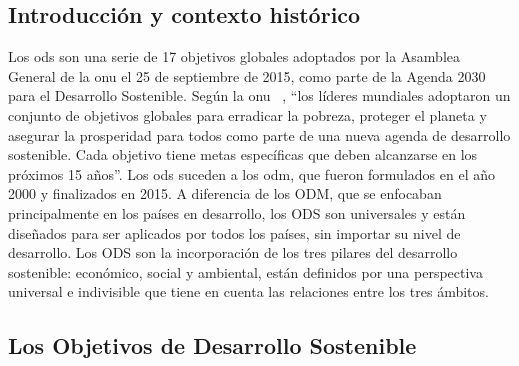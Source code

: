 	\subsection{Introducción y contexto histórico}
	Los \acrfull{ods} son una serie de 17 objetivos globales adoptados por la Asamblea General de la \acrfull{onu} el 25 de septiembre de 2015, como parte de la Agenda 2030 para el Desarrollo Sostenible. Según la \acrshort{onu} ~\cite{un_sustainable_development}, ``los líderes mundiales adoptaron un conjunto de objetivos globales para erradicar la pobreza, proteger el planeta y asegurar la prosperidad para todos como parte de una nueva agenda de desarrollo sostenible. Cada objetivo tiene metas específicas que deben alcanzarse en los próximos 15 años''.		
	Los \acrshort{ods} suceden a los \acrfull{odm}, que fueron formulados en el año 2000 y finalizados en 2015. A diferencia de los ODM, que se enfocaban principalmente en los países en desarrollo, los ODS son universales y están diseñados para ser aplicados por todos los países, sin importar su nivel de desarrollo. Los ODS son la incorporación de los tres pilares del desarrollo sostenible: económico, social y ambiental, están definidos por una perspectiva universal e indivisible que tiene en cuenta las relaciones entre los tres ámbitos.
		
	\subsection{Los Objetivos de Desarrollo Sostenible}
	
